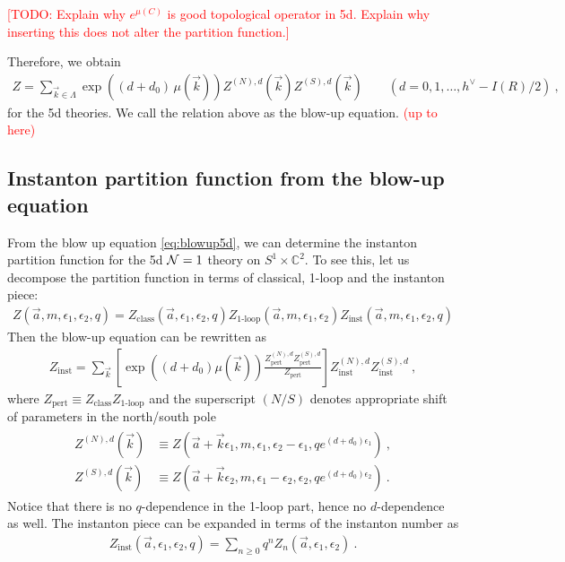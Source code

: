 \documentclass[letterpaper, 11pt]{article}
\def\IC{\mathbb{C}}
\def\CN{{\cal N}}
\def\e{\epsilon}
\begin{document}
\textcolor{red}{[TODO: Explain why $e^{\mu(C)}$ is good topological operator in 5d. Explain why inserting this does not alter the partition function.]}

Therefore, we obtain
\begin{align} \label{eq:blowup5d}
 Z = \sum_{\vec{k} \in \Lambda} \exp\left( (d+d_0)\, \mu(\vec{k}) \right) Z^{(N), d}(\vec{k})  Z^{(S), d}(\vec{k})  \qquad (d=0, 1, \ldots, h^\vee - I(R)/2 ) \ , 
\end{align} 
for the 5d theories. We call the relation above as the blow-up equation.  \textcolor{red}{(up to here)}

\subsection{Instanton partition function from the blow-up equation}
From the blow up equation \eqref{eq:blowup5d}, we can determine the instanton partition function for the 5d $\CN=1$ theory on $S^1 \times \IC^2$. To see this, let us decompose the partition function in terms of classical, 1-loop and the instanton piece:
\begin{align}
 Z(\vec{a}, m, \e_1, \e_2, q) = Z_{\textrm{class}}(\vec{a}, \e_1, \e_2, q) Z_{\textrm{1-loop}} (\vec{a}, m, \e_1, \e_2) Z_{\textrm{inst}}(\vec{a}, m, \e_1, \e_2, q)
\end{align}
Then the blow-up equation can be rewritten as
\begin{align}
 Z_{\textrm{inst}} = \sum_{\vec{k}} \left[ \exp\left( (d+d_0) \mu(\vec{k}) \right)  \frac{Z^{(N), d}_{\textrm{pert}} Z^{(S), d}_{\textrm{pert}}}{Z_{\textrm{pert}}} \right] Z^{(N), d}_{\textrm{inst}} Z^{(S), d}_{\textrm{inst}}  \ , 
\end{align}
where $Z_{\textrm{pert}} \equiv Z_{\textrm{class}} Z_{\textrm{1-loop}}$ and the superscript $(N/S)$ denotes appropriate shift of parameters in the north/south pole 
\begin{align}
\begin{split}
 Z^{(N), d}(\vec{k}) &\equiv Z(\vec{a}+\vec{k} \e_1, m, \e_1, \e_2-\e_1, q e^{(d+d_0)\e_1}) \ , \\
 Z^{(S), d}(\vec{k}) &\equiv Z(\vec{a}+\vec{k} \e_2, m, \e_1 - \e_2, \e_2, q e^{(d+d_0)\e_2}) \ . 
\end{split}
\end{align}
 Notice that there is no $q$-dependence in the 1-loop part, hence no $d$-dependence as well. 
The instanton piece can be expanded in terms of the instanton number as
\begin{align}
 Z_{\textrm{inst}} (\vec{a}, \e_1, \e_2, q) = \sum_{n \ge 0} q^n Z_n (\vec{a}, \e_1, \e_2) \ . 
\end{align}
\end{document}
